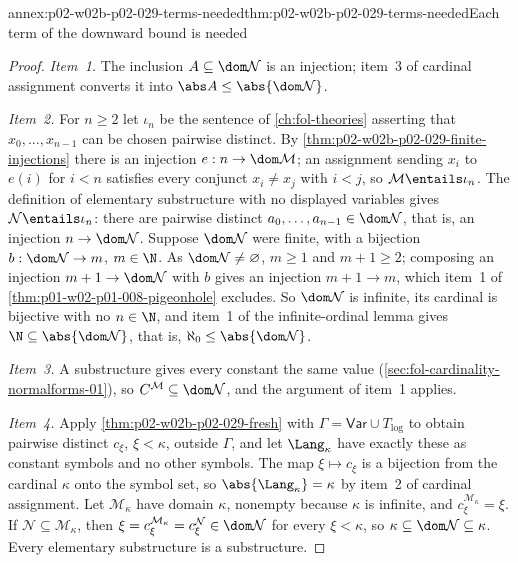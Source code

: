 \begin{annexitem}{annex:p02-w02b-p02-029-terms-needed}{thm:p02-w02b-p02-029-terms-needed}{Each term of the downward bound is needed}
\begin{proof}
\emph{Item~1.} The inclusion \(A\subseteq\dom\mathcal N\) is an injection;
item~3 of cardinal assignment converts it into
\(\abs A\leq\abs{\dom\mathcal N}\).

\emph{Item~2.} For \(n\geq2\) let \(\iota_n\) be the sentence of
\cref{ch:fol-theories} asserting that \(x_0,\ldots,x_{n-1}\) can be chosen
pairwise distinct. By \cref{thm:p02-w02b-p02-029-finite-injections} there is
an injection \(e:n\to\dom\mathcal M\); an assignment sending \(x_i\) to
\(e(i)\) for \(i<n\) satisfies every conjunct \(x_i\ne x_j\) with \(i<j\),
so \(\mathcal M\entails\iota_n\). The definition of elementary substructure
with no displayed variables gives \(\mathcal N\entails\iota_n\): there are
pairwise distinct \(a_0,\ldots,a_{n-1}\in\dom\mathcal N\), that is, an
injection \(n\to\dom\mathcal N\). Suppose \(\dom\mathcal N\) were finite,
with a bijection \(b:\dom\mathcal N\to m\), \(m\in\N\). As
\(\dom\mathcal N\neq\varnothing\), \(m\geq1\) and \(m+1\geq2\); composing an
injection \(m+1\to\dom\mathcal N\) with \(b\) gives an injection
\(m+1\to m\), which item~1 of \cref{thm:p01-w02-p01-008-pigeonhole}
excludes. So \(\dom\mathcal N\) is infinite, its cardinal is bijective with
no \(n\in\N\), and item~1 of the infinite-ordinal lemma gives
\(\N\subseteq\abs{\dom\mathcal N}\), that is,
\(\aleph_0\leq\abs{\dom\mathcal N}\).

\emph{Item~3.} A substructure gives every constant the same value
(\cref{sec:fol-cardinality-normalforms-01}), so
\(C^{\mathcal M}\subseteq\dom\mathcal N\), and the argument of item~1
applies.

\emph{Item~4.} Apply \cref{thm:p02-w02b-p02-029-fresh} with
\(\Gamma=\mathsf{Var}\cup T_{\mathrm{log}}\) to obtain pairwise distinct
\(c_\xi\), \(\xi<\kappa\), outside \(\Gamma\), and let \(\Lang_\kappa\) have
exactly these as constant symbols and no other symbols. The map
\(\xi\mapsto c_\xi\) is a bijection from the cardinal \(\kappa\) onto the
symbol set, so \(\abs{\Lang_\kappa}=\kappa\) by item~2 of cardinal
assignment. Let \(\mathcal M_\kappa\) have domain \(\kappa\), nonempty
because \(\kappa\) is infinite, and \(c_\xi^{\mathcal M_\kappa}=\xi\). If
\(\mathcal N\subseteq\mathcal M_\kappa\), then
\(\xi=c_\xi^{\mathcal M_\kappa}=c_\xi^{\mathcal N}\in\dom\mathcal N\) for every
\(\xi<\kappa\), so \(\kappa\subseteq\dom\mathcal N\subseteq\kappa\). Every
elementary substructure is a substructure.
\end{proof}
\end{annexitem}
